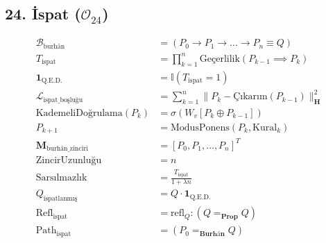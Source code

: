 \documentclass[11pt, a4paper]{article}
\begin{document}
\subsection{24. İspat ($\mathcal{O}_{24}$)}
\begin{align}
\mathcal{B}_{\text{burhân}} &= (P_0 \to P_1 \to \dots \to P_n \equiv Q) \\
T_{\text{ispat}} &= \prod_{k=1}^n \text{Geçerlilik}(P_{k-1} \implies P_k) \\
\mathbf{1}_{\text{Q.E.D.}} &= \mathbb{I}(T_{\text{ispat}} = 1) \\
\mathcal{L}_{\text{ispat\_boşluğu}} &= \sum_{k=1}^n \| P_k - \text{Çıkarım}(P_{k-1}) \|_{\mathbf{H}}^2 \\
\text{KademeliDoğrulama}(P_k) &= \sigma(W_v [P_k \oplus P_{k-1}]) \\
P_{k+1} &= \text{ModusPonens}(P_k, \text{Kural}_k) \\
\mathbf{M}_{\text{burhân\_zinciri}} &= [P_0, P_1, \dots, P_n]^T \\
\text{ZincirUzunluğu} &= n \\
\text{Sarsılmazlık} &= \frac{T_{\text{ispat}}}{1 + \lambda n} \\
Q_{\text{ispatlanmış}} &= Q \cdot \mathbf{1}_{\text{Q.E.D.}} \\
\text{Refl}_{\text{ispat}} &= \text{refl}_Q : (Q =_{\mathbf{Prop}} Q) \\
\text{Path}_{\text{ispat}} &= (P_0 =_{\mathbf{Burhân}} Q)
\end{align}
\end{document}

